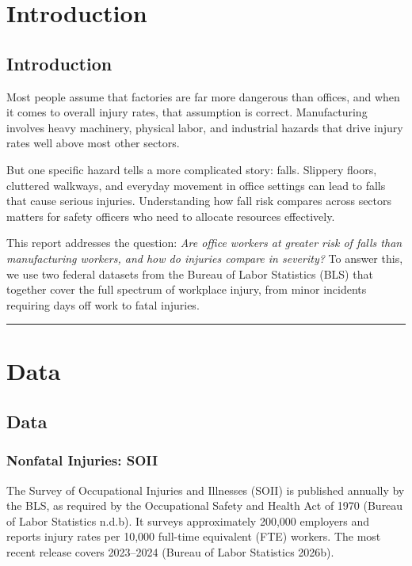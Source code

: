\documentclass[
  letterpaper,
  DIV=11,
  numbers=noendperiod]{scrreprt}
\begin{document}
\chapter{Introduction}\label{introduction}

\section{Introduction}\label{introduction-1}

Most people assume that factories are far more dangerous than offices,
and when it comes to overall injury rates, that assumption is correct.
Manufacturing involves heavy machinery, physical labor, and industrial
hazards that drive injury rates well above most other sectors.

But one specific hazard tells a more complicated story: falls. Slippery
floors, cluttered walkways, and everyday movement in office settings can
lead to falls that cause serious injuries. Understanding how fall risk
compares across sectors matters for safety officers who need to allocate
resources effectively.

This report addresses the question: \emph{Are office workers at greater
risk of falls than manufacturing workers, and how do injuries compare in
severity?} To answer this, we use two federal datasets from the Bureau
of Labor Statistics (BLS) that together cover the full spectrum of
workplace injury, from minor incidents requiring days off work to fatal
injuries.

\begin{center}\rule{0.5\linewidth}{0.5pt}\end{center}


\chapter{Data}\label{data}

\section{Data}\label{data-1}

\subsection{Nonfatal Injuries: SOII}\label{nonfatal-injuries-soii}

The Survey of Occupational Injuries and Illnesses (SOII) is published
annually by the BLS, as required by the Occupational Safety and Health
Act of 1970 (Bureau of Labor Statistics n.d.b). It surveys approximately
200,000 employers and reports injury rates per 10,000 full-time
equivalent (FTE) workers. The most recent release covers 2023--2024
(Bureau of Labor Statistics 2026b).
\end{document}
